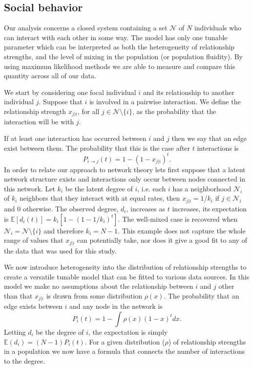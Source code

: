 \documentclass[10pt]{article}
\begin{document}
\begin{multicols}{2}
\subsection{Social behavior}
\label{social_mixing}
Our analysis concerns a closed system containing a set $\mathcal{N}$ of $N$ individuals who can interact with each other in some way. The model has only one tunable parameter which can be interpreted as both the heterogeneity of relationship strengths, and the level of mixing in the population (or population fluidity). By using maximum likelihood methods we are able to measure and compare this quantity across all of our data. 

We start by considering one focal individual $i$ and its relationship to another individual $j$. Suppose that $i$ is involved in a pairwise interaction. We define the relationship strength $x_{j|i}$, for all $j\in \mathcal{N}\setminus\{i\}$, as the probability that the interaction will be with $j$.
 
If at least one interaction has occurred between $i$ and $j$ then we say that an edge exist between them. The probability that this is the case after $t$ interactions is
\begin{equation}
\label{i_to_j}
P_{i \rightarrow j}(t)=1-(1-x_{j|i})^{t}.
\end{equation}
In order to relate our approach to network theory lets first suppose that a latent network structure exists and interactions only occur between nodes connected in this network. Let $k_{i}$ be the latent degree of $i$, i.e. each $i$ has a neighborhood $\mathcal{N}_{i}$ of $k_{i}$ neighbors that they interact with at equal rates, then $x_{j|i}=1/k_{i}$ if $j\in\mathcal{N}_{i}$ and $0$ otherwise. The observed degree, $d_{i}$, increases as $t$ increases, its expectation is $\mathbb{E}[d_{i}(t)]=k_{i}[1-(1-1/k_{i})^{t}]$. The well-mixed case is recovered when $\mathcal{N}_{i}=\mathcal{N}\setminus\{i\}$ and therefore $k_{i}=N-1$. This example does not capture the whole range of values that $x_{j|i}$ can potentially take, nor does it give a good fit to any of the data that was used for this study.

We now introduce heterogeneity into the distribution of relationship strengths to create a versatile tunable model that can be fitted to various data sources. In this model we make no assumptions about the relationship between $i$ and $j$ other than that $x_{j|i}$ is drawn from some distribution $\rho(x)$. The probability that an edge exists between $i$ and any node in the network is
\begin{equation}
\label{i_to_any}
P_{i}(t)=1-\int\rho(x)(1-x)^{t}dx.
\end{equation}
Letting $d_{i}$ be the degree of $i$, the expectation is simply $\mathbb{E}(d_{i})=(N-1)P_{i}(t)$. For a given distribution ($\rho$) of relationship strengths in a population we now have a formula that connects the number of interactions to the degree.


\end{multicols}
\end{document}
